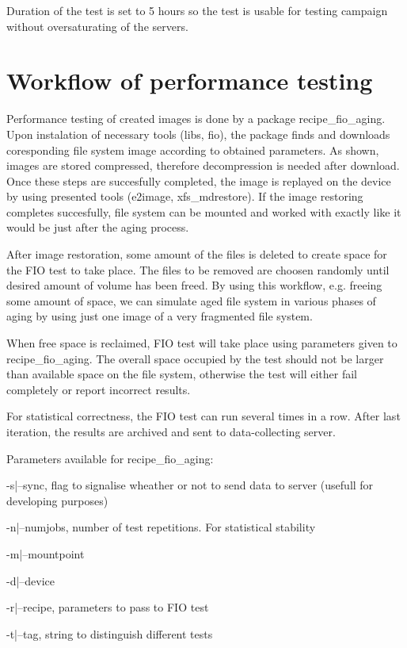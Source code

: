 \documentclass[
  color, %
  table, %
  lof,   %
  lot,   %
]{fithesis3}
\begin{document}
Duration of the test is set to 5 hours so the test is usable for testing campaign without oversaturating of the servers.

\section{Workflow of performance testing}
Performance testing of created images is done by a package recipe\_fio\_aging. Upon instalation of necessary tools (libs, fio), the package finds and downloads coresponding file system image according to obtained parameters. As shown, images are stored compressed, therefore decompression is needed after download. Once these steps are succesfully completed, the image is replayed on the device by using presented tools (e2image, xfs\_mdrestore). If the image restoring completes succesfully, file system can be mounted and worked with exactly like it would be just after the aging process.

After image restoration, some amount of the files is deleted to create space for the FIO test to take place. The files to be removed are choosen randomly until desired amount of volume has been freed. By using this workflow, e.g. freeing some amount of space, we can simulate aged file system in various phases of aging by using just one image of a very fragmented file system.

When free space is reclaimed, FIO test will take place using parameters given to recipe\_fio\_aging. The overall space occupied by the test should not be larger than available space on the file system, otherwise the test will either fail completely or report incorrect results.

For statistical correctness, the FIO test can run several times in a row. After last iteration, the results are archived and sent to data-collecting server.

Parameters available for recipe\_fio\_aging:
\begin{compactenum}
  \item -s|--sync, flag to signalise wheather or not to send data to server (usefull for developing purposes)
  \item -n|--numjobs, number of test repetitions. For statistical stability
  \item -m|--mountpoint
  \item -d|--device
  \item -r|--recipe, parameters to pass to FIO test
  \item -t|--tag, string to distinguish different tests
  \end{compactenum}
\end{document}
